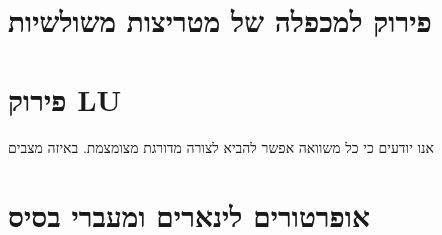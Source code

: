 \documentclass{tstextbook}
\begin{document}
\section{פירוק למכפלה של מטריצות משולשיות}

\section{פירוק LU}

אנו יודעים כי כל משוואה אפשר להביא לצורה מדורגת מצומצמת. באיזה מצבים 


\section{אופרטורים לינארים ומעברי בסיס}
\end{document}

